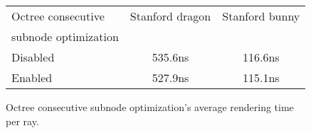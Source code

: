 
\begin{figure}[H]
    \tiny
    \centering
    \begin{tabular}{ | l | c | c | }

        \hline
        Octree consecutive & Stanford dragon & Stanford bunny \\
        subnode optimization & ~ & ~ \\
        \hline
        Disabled & 535.6ns & 116.6ns \\
        Enabled & 527.9ns & 115.1ns \\
        \hline

    \end{tabular}
    \caption{
        Octree consecutive subnode optimization's average rendering time
        per ray.
    }
    \label{table:octree_consecutive_subnode}
\end{figure}
